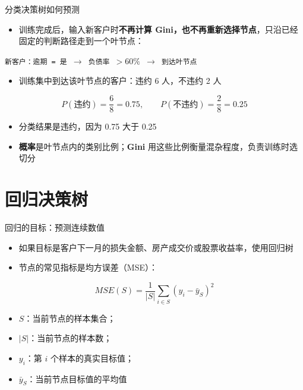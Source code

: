 \documentclass[10pt,aspectratio=43]{beamer}
\begin{document}
\begin{frame}{分类决策树如何预测}
  \begin{itemize}
    \item 训练完成后，输入新客户时\textbf{不再计算 Gini，也不再重新选择节点}，只沿已经固定的判断路径走到一个叶节点：
  \end{itemize}
  \begin{center}
    \texttt{新客户：逾期 = 是 $\rightarrow$ 负债率 $>60\%$ $\rightarrow$ 到达叶节点}
  \end{center}
  \begin{itemize}
    \item 训练集中到达该叶节点的客户：违约 6 人，不违约 2 人
  \end{itemize}
  \[
    P(\text{违约})=\frac68=0.75,\qquad P(\text{不违约})=\frac28=0.25
  \]
  \begin{itemize}
    \item 分类结果是违约，因为 0.75 大于 0.25
    \item \textbf{概率}是叶节点内的类别比例；\textbf{Gini} 用这些比例衡量混杂程度，负责训练时选切分
  \end{itemize}
\end{frame}

\section{回归决策树}

\begin{frame}{回归的目标：预测连续数值}
  \begin{itemize}
    \item 如果目标是客户下一月的损失金额、房产成交价或股票收益率，使用回归树
    \item 节点的常见指标是均方误差（MSE）：
  \end{itemize}
  \[
    MSE(S)=\frac{1}{|S|}\sum_{i\in S}\left(y_i-\bar{y}_S\right)^2
  \]
  \begin{itemize}
    \item $S$：当前节点的样本集合；
    \item $|S|$：当前节点的样本数；
    \item $y_i$：第 $i$ 个样本的真实目标值；
    \item $\bar{y}_S$：当前节点目标值的平均值
  \end{itemize}
\end{frame}
\end{document}
